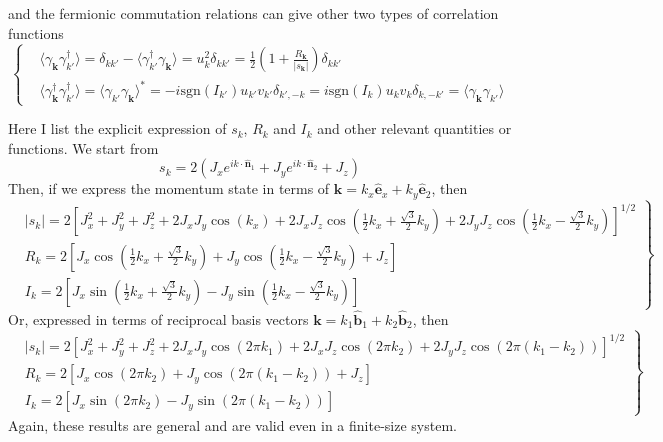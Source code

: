 \documentclass[12font]{article}
\numberwithin{equation}{section}    %
\theoremstyle{definition}
\newcommand{\anglelr}[1]{\langle #1 \rangle}
\newcommand{\lr}[1]{\left(  #1  \right)}
\newcommand{\lrm}[1]{\left[  #1  \right]}
\newcommand{\abs}[1]{\left|  #1  \right|}
\newcommand{\mrm}[1]{\mathrm{#1}}
\newcommand{\bo}[1]{\mathbf{#1}}
\begin{document}
and the fermionic commutation relations can give other two types of correlation functions
\[
\left\{
\begin{aligned}
& \anglelr{\gamma_{\bo{k}}\gamma_{k'}^\dagger} = \delta_{kk'} - \anglelr{\gamma^\dagger_{k'}\gamma_{\bo{k}}} = u^2_k\delta_{kk'} = \frac{1}{2}\lr{1+\frac{R_{\bo{k}}}{\abs{s_{\bo{k}}}}}\delta_{kk'} \\
& \anglelr{\gamma_{\bo{k}}^\dagger\gamma_{k'}^\dagger} = \anglelr{\gamma_{k'}\gamma_{\bo{k}}}^* = -i\mrm{sgn}(I_{k'})u_{k'}v_{k'}\delta_{k',-k} = i\mrm{sgn}(I_{k})u_{k}v_{k}\delta_{k,-k'} = \anglelr{\gamma_{\bo{k}}\gamma_{k'}}
\end{aligned}
\right.
\]

Here I list the explicit expression of $s_k$, $R_k$ and $I_k$ and other relevant quantities or functions. We start from 
\[
s_k = 2\lr{J_x e^{ik\cdot \hat{\bo{n}}_1} + J_y e^{ik\cdot \hat{\bo{n}}_2} + J_z}
\]
Then, if we express the momentum state in terms of $\bo{k} = k_x\hat{\bo{e}}_x + k_y\hat{\bo{e}}_2$, then
\begin{equation}\label{eq:functions}
  \left.
  \begin{aligned}
  &\abs{s_k} = 2\lrm{J_x^2+J_y^2+J_z^2 + 2J_xJ_y\cos\lr{k_x} + 2J_xJ_z\cos\lr{\frac{1}{2}k_x+\frac{\sqrt{3}}{2}k_y} + 2J_yJ_z\cos\lr{\frac{1}{2}k_x-\frac{\sqrt{3}}{2}k_y}}^{1/2} \\
  & R_k = 2\lrm{J_x\cos\lr{\frac{1}{2}k_x+\frac{\sqrt{3}}{2}k_y} + J_y\cos\lr{\frac{1}{2}k_x-\frac{\sqrt{3}}{2}k_y} + J_z}\\
  &I_k = 2\lrm{J_x\sin\lr{\frac{1}{2}k_x+\frac{\sqrt{3}}{2}k_y} - J_y\sin\lr{\frac{1}{2}k_x-\frac{\sqrt{3}}{2}k_y}}
  \end{aligned}
  \right\}
\end{equation}
Or, expressed in terms of reciprocal basis vectors $\bo{k} = k_1\hat{\bo{b}}_1 + k_2\hat{\bo{b}}_2$, then
\begin{equation}\label{eq:functions_b}
  \left.
  \begin{aligned}
  &\abs{s_k} 
  = 
  2\lrm{
      J_x^2+J_y^2+J_z^2 + 2J_xJ_y\cos\lr{2\pi k_1} 
      + 
      2J_xJ_z\cos\lr{2\pi k_2} 
      + 
      2J_yJ_z\cos\lr{2\pi (k_1 - k_2)}
  }^{1/2} \\
  & R_k 
  = 2\lrm{
      J_x\cos\lr{2\pi k_2} 
      + 
      J_y\cos\lr{2\pi (k_1 - k_2)} 
      + 
      J_z
  }\\
  &I_k 
  = 2\lrm{
      J_x\sin\lr{2\pi k_2} 
      - 
      J_y\sin\lr{2\pi (k_1 - k_2)}
  }
  \end{aligned}
  \right\}
\end{equation}
Again, these results are general and are valid even in a finite-size system.
\end{document}
